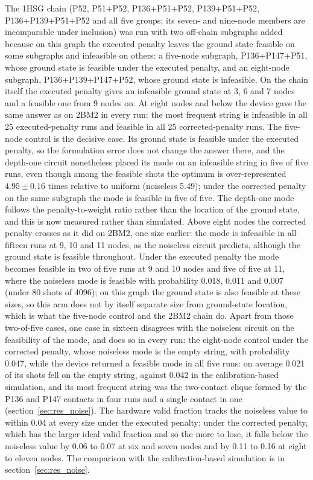 \documentclass{iopjournal}
\begin{document}
The 1HSG chain (P52, P51+P52, P136+P51+P52, P139+P51+P52, P136+P139+P51+P52 and all five groups; its seven- and nine-node members are incomparable under inclusion) was run with two off-chain subgraphs added because on this graph the executed penalty leaves the ground state feasible on some subgraphs and infeasible on others: a five-node subgraph, P136+P147+P51, whose ground state is feasible under the executed penalty, and an eight-node subgraph, P136+P139+P147+P52, whose ground state is infeasible. On the chain itself the executed penalty gives an infeasible ground state at 3, 6 and 7 nodes and a feasible one from 9 nodes on. At eight nodes and below the device gave the same answer as on 2BM2 in every run: the most frequent string is infeasible in all 25 executed-penalty runs and feasible in all 25 corrected-penalty runs. The five-node control is the decisive case. Its ground state is feasible under the executed penalty, so the formulation error does not change the answer there, and the depth-one circuit nonetheless placed its mode on an infeasible string in five of five runs, even though among the feasible shots the optimum is over-represented $4.95 \pm 0.16$ times relative to uniform (noiseless 5.49); under the corrected penalty on the same subgraph the mode is feasible in five of five. The depth-one mode follows the penalty-to-weight ratio rather than the location of the ground state, and this is now measured rather than simulated. Above eight nodes the corrected penalty crosses as it did on 2BM2, one size earlier: the mode is infeasible in all fifteen runs at 9, 10 and 11 nodes, as the noiseless circuit predicts, although the ground state is feasible throughout. Under the executed penalty the mode becomes feasible in two of five runs at 9 and 10 nodes and five of five at 11, where the noiseless mode is feasible with probability 0.018, 0.011 and 0.007 (under 80 shots of 4096); on this graph the ground state is also feasible at these sizes, so this arm does not by itself separate size from ground-state location, which is what the five-node control and the 2BM2 chain do. Apart from those two-of-five cases, one case in sixteen disagrees with the noiseless circuit on the feasibility of the mode, and does so in every run: the eight-node control under the corrected penalty, whose noiseless mode is the empty string, with probability 0.047, while the device returned a feasible mode in all five runs: on average 0.021 of its shots fell on the empty string, against 0.042 in the calibration-based simulation, and its most frequent string was the two-contact clique formed by the P136 and P147 contacts in four runs and a single contact in one (section~\ref{sec:res_noise}). The hardware valid fraction tracks the noiseless value to within 0.04 at every size under the executed penalty; under the corrected penalty, which has the larger ideal valid fraction and so the more to lose, it falls below the noiseless value by 0.06 to 0.07 at six and seven nodes and by 0.11 to 0.16 at eight to eleven nodes. The comparison with the calibration-based simulation is in section~\ref{sec:res_noise}.
\end{document}
